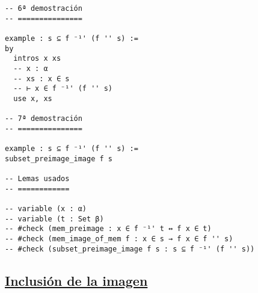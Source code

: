 \begin{verbatim}
-- 6ª demostración
-- ===============

example : s ⊆ f ⁻¹' (f '' s) :=
by
  intros x xs
  -- x : α
  -- xs : x ∈ s
  -- ⊢ x ∈ f ⁻¹' (f '' s)
  use x, xs

-- 7ª demostración
-- ===============

example : s ⊆ f ⁻¹' (f '' s) :=
subset_preimage_image f s

-- Lemas usados
-- ============

-- variable (x : α)
-- variable (t : Set β)
-- #check (mem_preimage : x ∈ f ⁻¹' t ↔ f x ∈ t)
-- #check (mem_image_of_mem f : x ∈ s → f x ∈ f '' s)
-- #check (subset_preimage_image f s : s ⊆ f ⁻¹' (f '' s))
\end{verbatim}

\subsection{\href{./src/Conjuntos/Inclusion\_de\_la\_imagen.lean}{Inclusión de la imagen}}
\label{sec:orgc100d40}
